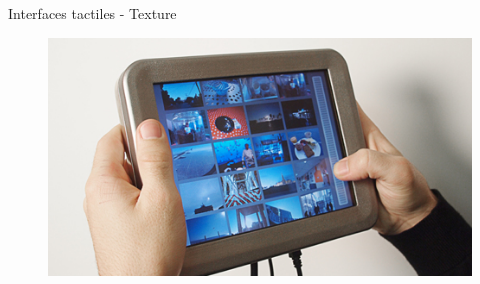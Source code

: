 {
\begin{frame}{Interfaces tactiles - Texture}
\begin{figure}
\href{run:videos/TeslaTouch.mov}{\includegraphics[width=\linewidth]{images/teslatouch-03}}
\end{figure}
\end{frame}
}

